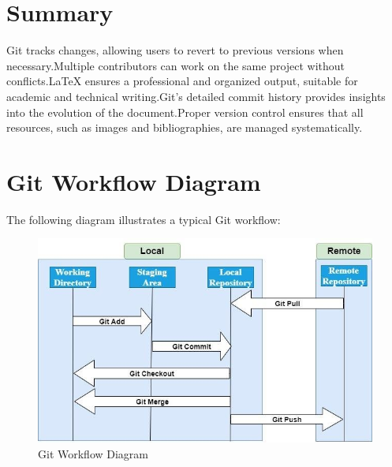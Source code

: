 \documentclass{article}
\begin{document}
\section{Summary}
Git tracks changes, allowing users to revert to previous versions when necessary.Multiple contributors can work on the same project without conflicts.LaTeX ensures a professional and organized output, suitable for academic and technical writing.Git's detailed commit history provides insights into the evolution of the document.Proper version control ensures that all resources, such as images and bibliographies, are managed systematically.

\section{Git Workflow Diagram}
The following diagram illustrates a typical Git workflow:

\begin{figure}[h]
    \centering
    \includegraphics[width=\textwidth]{git_workflow.jpg}
    \caption{Git Workflow Diagram}
    \label{fig:git_workflow}
\end{figure}
\end{document}
